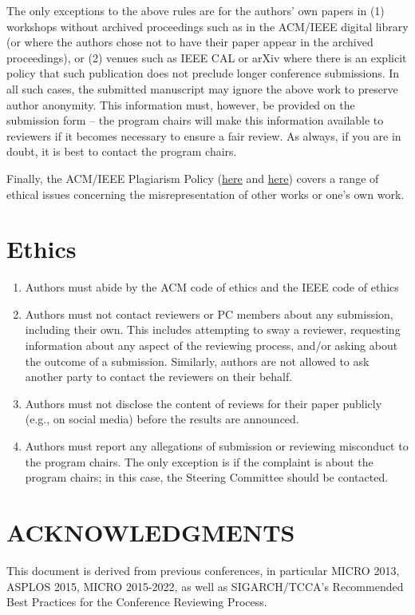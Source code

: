 \documentclass{common/sig-alternate}
\begin{document}
The only exceptions to the above rules are for the authors' own papers in (1) workshops without archived proceedings such as in the ACM/IEEE digital library (or where the authors chose not to have their paper appear in the archived proceedings), or (2) venues such as IEEE CAL or arXiv where there is an explicit policy that such publication does not preclude longer conference submissions.  In all such cases, the submitted manuscript may ignore the above work to preserve author anonymity. This information must, however, be provided on the submission form -- the program chairs will make this information available to reviewers if it becomes necessary to ensure a fair review.  As always, if you are in doubt, it is best to contact the program chairs.


Finally, the ACM/IEEE Plagiarism Policy (\href{http://www.acm.org/publications/policies/plagiarism_policy}{here} and \href{https://www.ieee.org/publications_standards/publications/rights/plagiarism.html}{here}) covers a range of ethical issues concerning the misrepresentation of other works or one's own work.


\section{Ethics}

\begin{enumerate}
\item Authors must abide by the ACM code of ethics and the IEEE code of ethics
\item Authors must not contact reviewers or PC members about any submission, including their own. This includes attempting to sway a reviewer, requesting information about any aspect of the reviewing process, and/or asking about the outcome of a submission. Similarly, authors are not allowed to ask another party to contact the reviewers on their behalf.
\item Authors must not disclose the content of reviews for their paper publicly (e.g., on social media)  before the results are announced. 
\item Authors must report any allegations of submission or reviewing misconduct to the program chairs. The only exception is if the complaint is about the program chairs; in this case, the Steering Committee should be contacted. 
\end{enumerate}


\section*{ACKNOWLEDGMENTS}
This document is derived from previous conferences, in particular MICRO 2013, ASPLOS 2015, MICRO 2015-2022, as well as SIGARCH/TCCA's Recommended Best Practices for the Conference Reviewing Process.






\end{document}
